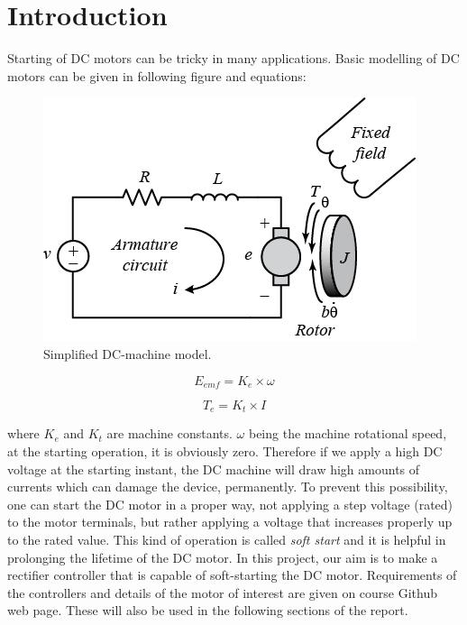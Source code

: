 \section{Introduction} \label{intro}

Starting of DC motors can be tricky in many applications. Basic modelling of DC motors can be given in following figure and equations:

\begin{figure}[ht!]
    \centering
    \includegraphics{Figures/DC_motor_model.png}
    \caption{Simplified DC-machine model.}
    \label{fig:DC-mmotor}
\end{figure}

\begin{equation}
    E_{emf} = K_e\times\omega
\end{equation}

\begin{equation}
    T_e = K_t\times I
\end{equation}

where $K_e$ and $K_t$ are machine constants. $\omega$ being the machine rotational speed, at the starting operation, it is obviously zero. Therefore if we apply a high DC voltage at the starting instant, the DC machine will draw high amounts of currents which can damage the device, permanently. To prevent this possibility, one can start the DC motor in a proper way, not applying a step voltage (rated) to the motor terminals, but rather applying a voltage that increases properly up to the rated value. This kind of operation is called \textit{soft start} and it is helpful  in prolonging the lifetime of the DC motor. In this project, our aim is to make a rectifier controller that is capable of soft-starting the DC motor. Requirements of the controllers and details of the motor of interest are given on course Github web page.\cite{course_git} These will also be used in the following sections of the report.

